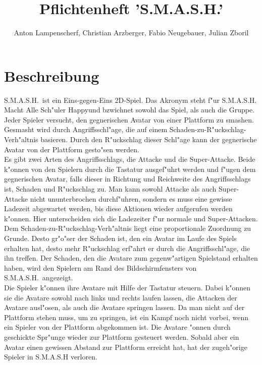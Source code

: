 \documentclass[a4paper, 11pt]{article}
\title{Pflichtenheft 'S.M.A.S.H.'}
\author{Anton Lampenscherf, Christian Arzberger, Fabio Neugebauer, Julian Zboril}
\begin{document}
    \maketitle

    \section{Beschreibung}\label{sec:beschreibung}
    S.M.A.S.H.\ ist ein Eins-gegen-Eins 2D-Spiel.
    Das Akronym steht f"ur \glqq S.M.A.S.H. Macht Alle Sch"uler Happy\grqq und bzwichnet sowohl das Spiel, als auch die Gruppe. %
    Jeder Spieler versucht, den gegnerischen Avatar von einer Plattform zu \glqq smashen\grqq.\\

    \noindent
    Gesmasht wird durch Angriffsschl"age, die auf einem Schaden-zu-R"uckschlag-Verh"altnis basieren.
    Durch den R"uckschlag dieser Schl"age kann der gegnerische Avatar von der Plattform gesto"sen werden.\\

    \noindent
    Es gibt zwei Arten des Angriffsschlags, die Attacke und die Super-Attacke.
    Beide k"onnen von den Spielern durch die Tastatur ausgef"uhrt werden und f"ugen dem gegnerischen Avatar, falls dieser in Richtung und Reichweite des Angriffsschlags ist, Schaden und R"uckschlag zu.
    Man kann sowohl Attacke als auch Super-Attacke nicht ununterbrochen durchf"uhren, sondern es muss eine gewisse Ladezeit abgewartet werden, bis diese Aktionen wieder aufgerufen werden k"onnen.
    Hier unterscheiden sich die Ladezeiter f"ur normale und Super-Attacken.\\

    \noindent
    Dem Schaden-zu-R"uckschlag-Verh"altnis liegt eine proportionale Zuordnung zu Grunde.
    Desto gr"o"ser der Schaden ist, den ein Avatar im Laufe des Spiels erhalten hat, desto mehr R"uckschlag erf"ahrt er durch die Angriffsschl"age, die ihn treffen.
    Der Schaden, den die Avatare zum gegenw"artigen Spielstand erhalten haben, wird den Spielern am Rand des Bildschirmfensters von S.M.A.S.H.\ angezeigt.\\

    \noindent
    Die Spieler k"onnen ihre Avatare mit Hilfe der Tastatur steuern.
    Dabei k"onnen sie die Avatare sowohl nach links und rechts laufen lassen, die Attacken der Avatare ausl"osen, als auch die Avatare springen lassen.
    Da man nicht auf der Plattform stehen muss, um zu springen, ist ein Kampf noch nicht vorbei, wenn ein Spieler von der Plattform abgekommen ist.
    Die Avatare "onnen durch geschickte Spr"unge wieder zur Plattform gesteuert werden.
    Sobald aber ein Avatar einen gewissen Abstand zur Plattform erreicht hat, hat der zugeh"orige Spieler in S.M.A.S.H verloren.\\
\end{document}
